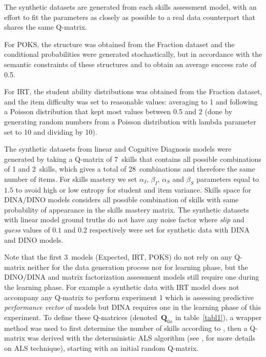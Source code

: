 The synthetic datasets are generated from each skills assessment model, with an effort to fit the parameters as closely as possible to a real data counterpart that shares the same Q-matrix. 

For POKS, the structure was obtained from the Fraction dataset and the conditional probabilities were generated stochastically, but in accordance with the semantic constraints of these structures and to obtain an average success rate of 0.5.

For IRT, the student ability distributions was obtained from the Fraction dataset, and the item difficulty was set to reasonable values: averaging to 1 and following a Poisson distribution that kept most values between 0.5 and 2 (done by generating random numbers from a Poisson distribution with lambda parameter set to 10 and dividing by 10). 

The synthetic datasets from linear and Cognitive Diagnosis models were generated by taking a Q-matrix of 7~skills that contains all possible combinations of 1 and 2~skills, which gives a total of 28~combinations and therefore the same number of items. For skills mastery we set $\alpha_I$, $\beta_I$, $\alpha_S$ and $\beta_S$ parameters equal to $1.5$ to avoid high or low entropy for student and item variance. Skills space for DINA/DINO models considers all possible combination of skills with same probability of appearance in the skills mastery matrix. 
The synthetic datasets with linear model ground truths do not have any noise factor where \textit{slip} and \textit{guess} values of $0.1$ and $0.2$ respectively were set for synthetic data with DINA and DINO models.

Note that the first 3~models (Expected, IRT, POKS) do not rely on any Q-matrix neither for the data generation process nor for learning phase, but the DINO/DINA and matrix factorization assessment models still require one during the learning phase. For example a synthetic data with IRT model does not accompany any Q-matrix to perform experiment 1 which is assessing predictive \textit{performance vector} of models but DINA requires one in the learning phase of this experiment. To define these Q-matrices (denoted~$\mathbf{Q}_{0x}$ in table~\ref{tabl1}), a wrapper method was used to first determine the number of skills according to \citet{Beheshti2012Numbers}, then a Q-matrix was derived with the deterministic ALS algorithm (see \citealp{Desmarais2013aied}, for more details on ALS technique), starting with an initial random Q-matrix.




